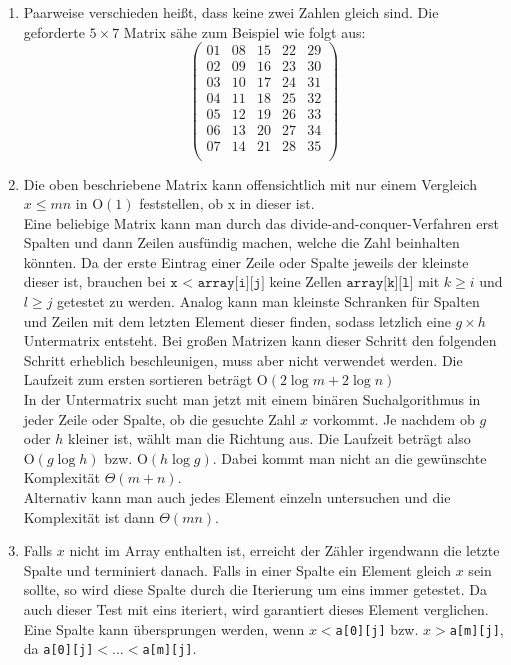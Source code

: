 \documentclass[a4paper,11pt]{article}             %
\begin{document}
\begin{enumerate}
\item Paarweise verschieden heißt, dass keine zwei Zahlen gleich sind. Die geforderte $5 \times 7$ Matrix sähe zum Beispiel wie folgt aus:
\begin{equation*}
\begin{pmatrix}
01&08&15&22&29\\
02&09&16&23&30\\
03&10&17&24&31\\
04&11&18&25&32\\
05&12&19&26&33\\
06&13&20&27&34\\
07&14&21&28&35\\
\end{pmatrix}
\end{equation*}

\item Die oben beschriebene Matrix kann offensichtlich mit nur einem Vergleich \texttt{$x \leq m  n$} in $\mathrm{O}(1)$ feststellen, ob x in dieser ist.\\
Eine beliebige Matrix kann man durch das divide-and-conquer-Verfahren erst Spalten und dann Zeilen ausfündig machen, welche die Zahl beinhalten könnten. Da der erste Eintrag einer Zeile oder Spalte jeweils der kleinste dieser ist, brauchen bei $\texttt{x < array[i][j]}$ keine Zellen $\texttt{array[k][l]}$ mit $k\geq i$ und $l \geq j$ getestet zu werden. Analog kann man kleinste Schranken für Spalten und Zeilen mit dem letzten Element dieser finden, sodass letzlich eine $g \times h$ Untermatrix entsteht. Bei großen Matrizen kann dieser Schritt den folgenden Schritt erheblich beschleunigen, muss aber nicht verwendet werden. Die Laufzeit zum ersten sortieren beträgt $\mathrm{O}(2 \log m + 2 \log n)$\\
In der Untermatrix sucht man jetzt mit einem binären Suchalgorithmus in jeder Zeile oder Spalte, ob die gesuchte Zahl $x$ vorkommt. Je nachdem ob $g$ oder $h$ kleiner ist, wählt man die Richtung aus. Die Laufzeit beträgt also $\mathrm{O}(g \log h)$ bzw. $\mathrm{O}(h \log g)$.
Dabei kommt man nicht an die gewünschte Komplexität $\Theta(m + n)$.\\
Alternativ kann man auch jedes Element einzeln untersuchen und die Komplexität ist dann $\Theta(mn)$.

\setcounter{enumi}{3}
\item Falls $x$ nicht im Array enthalten ist, erreicht der Zähler irgendwann die letzte Spalte und terminiert danach. Falls in einer Spalte ein Element gleich $x$ sein sollte, so wird diese Spalte durch die Iterierung um eins immer getestet. Da auch dieser Test mit eins iteriert, wird garantiert dieses Element verglichen.\\
Eine Spalte kann übersprungen werden, wenn $x < $\texttt{a[0][j]} bzw. $x > $\texttt{a[m][j]}, \newline da \texttt{a[0][j]}$ < \dots < $\texttt{a[m][j]}.
\end{enumerate}
\end{document}
